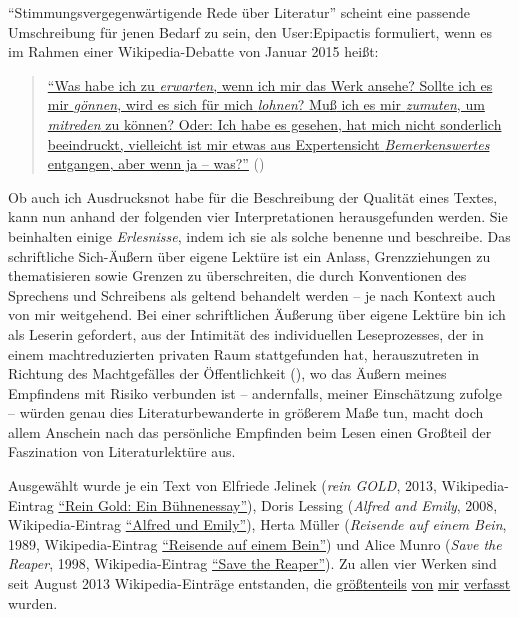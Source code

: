 \documentclass[fontsize=12pt]{scrartcl}
\begin{document}
"`Stimmungsvergegenw\"artigende Rede \"uber Li\-te\-ra\-tur"' scheint eine passende Umschreibung f\"ur jenen Bedarf zu sein, den \mbox{User}:Epipactis formuliert, wenn es im Rahmen einer Wi\-ki\-pe\-dia-Debatte von Januar 2015 hei{\ss}t: 

\singlespacing
\begin{quote}
\href{https://de.wikipedia.org/w/index.php?title=Benutzer_Diskussion:Grillenwaage\&diff=next\&oldid=137663350}{"`Was habe ich zu \textit{erwarten}, wenn ich mir das Werk ansehe? Sollte ich es mir \textit{g\"onnen}, wird es sich f\"ur mich \textit{lohnen}? Mu{\ss} ich es mir \textit{zumuten}, um \textit{mitreden} zu k\"onnen? Oder: Ich habe es gesehen, hat mich nicht sonderlich beeindruckt, vielleicht ist mir etwas aus Expertensicht \textit{Bemerkenswertes} entgangen, aber wenn ja -- was?"'} (\cite{UserEpipactis2015a})
\end{quote}
\onehalfspacing 

Ob auch ich Ausdrucksnot habe f\"ur die Beschreibung der Qualit\"at eines Textes, kann nun anhand der folgenden \mbox{vier} Interpretationen he\-rausgefunden werden. Sie beinhalten einige \textit{Erlesnisse}, indem ich sie als solche benenne und beschreibe. Das schriftliche Sich-\"Au{\ss}ern \"uber eigene Lekt\"ure ist ein Anlass, Grenzziehungen zu thematisieren sowie Grenzen zu \"uberschreiten, die durch Konventionen des Sprechens und Schrei\-bens als geltend behandelt werden -- je nach Kontext auch von mir weitgehend. Bei einer schriftlichen \"Au{\ss}erung \"uber eigene Lekt\"ure bin ich als Leserin\textsuperscript{\tiny *} gefordert, aus der Intimit\"at des individuellen Leseprozesses, der in einem machtreduzierten privaten Raum stattgefunden hat, he\-rauszutreten in Richtung des Machtgef\"alles der \"Of\-fent\-lichkeit (\cite{Lorenz2012}), wo das \"Au{\ss}ern meines Empfindens mit Risiko verbunden ist -- andernfalls, meiner Einsch\"atzung zufolge -- w\"urden genau dies Literaturbewanderte in gr\"o{\ss}erem Ma{\ss}e tun, macht doch allem Anschein nach das pers\"onliche Empfinden beim Lesen einen Gro{\ss}teil der Faszination von Literaturlekt\"ure aus.

Ausgew\"ahlt wurde je ein Text von Elfriede Jelinek (\textit{rein GOLD}, 2013, Wikipedia-Eintrag \href{https://de.wikipedia.org/wiki/Rein_Gold:_Ein_B\%C3\%BChnenessay}{"`Rein Gold: Ein B\"uhnenessay"'}), Doris Lessing (\textit{Alfred and Emily}, 2008, Wikipedia-Eintrag \href{https://de.wikipedia.org/wiki/Alfred_und_Emily}{"`Alfred und Emily"'}), Herta M\"uller (\textit{Reisende auf einem Bein}, 1989, Wikipedia-Eintrag \href{https://de.wikipedia.org/wiki/Reisende_auf_einem_Bein}{"`Reisende auf einem Bein"'}) und Alice Munro (\textit{Save the Reaper}, 1998, Wikipedia-Eintrag \href{https://de.wikipedia.org/wiki/Save_the_Reaper}{"`Save the Reaper"'}). Zu allen \mbox{vier} Werken sind seit August 2013 Wi\-ki\-pe\-dia-Eintr\"age entstanden, die \href{https://tools.wmflabs.org/wikihistory/wh.php?page_title=Rein_Gold:_Ein_B\%C3\%BChnenessay}{gr\"o{\ss}tenteils} \href{https://tools.wmflabs.org/wikihistory/wh.php?page_title=Alfred_und_Emily}{von} \href{https://tools.wmflabs.org/wikihistory/wh.php?page_title=Reisende_auf_einem_Bein}{mir} \href{https://tools.wmflabs.org/wikihistory/wh.php?page_title=Save_the_Reaper}{verfasst} wurden.
\end{document}
